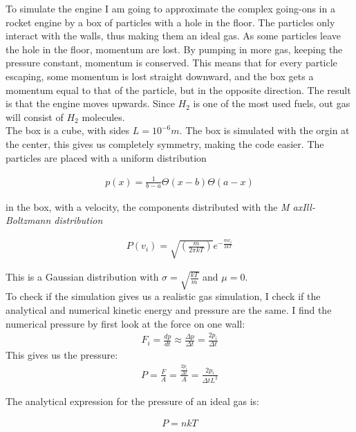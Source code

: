 \documentclass[a4paper, 10pt]{article}
\begin{document}
To simulate the engine I am going to approximate the complex going-ons in a rocket engine by a box of particles with a hole in the floor. The particles only interact with the walls, thus making them an ideal gas. As some particles leave the hole in the floor, momentum are lost. By pumping in more gas, keeping the pressure constant, momentum is conserved. This means that for every particle escaping, some momentum is lost straight downward, and the box gets a momentum equal to that of the particle, but in the opposite direction. The result is that the engine moves upwards. Since $H_2$ is one of the most used fuels, out gas will consist of $H_2$ molecules.\\

The box is a cube, with sides $L = 10^{-6}m$. The box is simulated with the orgin at the center, this gives us completely symmetry, making the code easier. The particles are placed with a uniform distribution 

\begin{align}
p(x) = \frac{1}{b-a}\Theta(x-b)\Theta(a-x)
\end{align}

in the box, with a velocity, the components distributed with the \textit{M axIll-Boltzmann distribution}

\begin{align}
P(v_i) = \sqrt{\left( \frac{m}{2 \pi k T} \right)} e^{-\frac{m v_i}{2kT}}
\end{align}

This is a Gaussian distribution with $\sigma = \sqrt{ \frac{kT}{m}}$
and $\mu = 0$.\\

To check if the simulation gives us a realistic gas simulation, I check if the analytical and numerical kinetic energy and pressure are the same. I find the numerical pressure by first look at the force on one wall:
\begin{align}
F_i = \frac{dp}{dt} \approx \frac{\Delta p}{\Delta t} = \frac{2p_i}{\Delta t}
\end{align}
This gives us the pressure:
\begin{align}
P = \frac{F}{A} = \frac{\frac{2p_i}{\Delta t}}{A} = \frac{2p_i}{\Delta t L^{2}}
\end{align}

The analytical expression for the pressure of an ideal gas is:

\begin{align}
P = nkT
\end{align}
\end{document}
